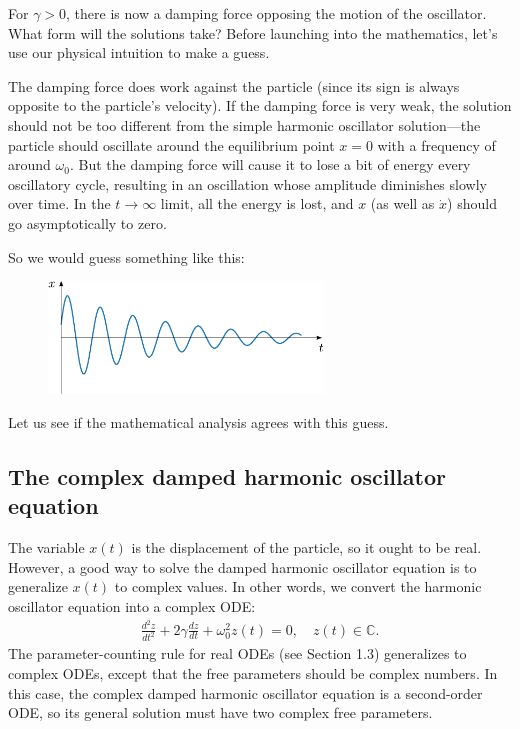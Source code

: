 \documentclass[10pt,a4paper]{article}
\begin{document}
For $\gamma > 0$, there is now a damping force opposing the motion of
the oscillator. What form will the solutions take?  Before launching
into the mathematics, let's use our physical intuition to make a
guess.

The damping force does work against the particle (since its sign is
always opposite to the particle's velocity). If the damping force is
very weak, the solution should not be too different from the simple
harmonic oscillator solution---the particle should oscillate around
the equilibrium point $x = 0$ with a frequency of around
$\omega_0$. But the damping force will cause it to lose a bit of
energy every oscillatory cycle, resulting in an oscillation whose
amplitude diminishes slowly over time. In the $t \rightarrow \infty$
limit, all the energy is lost, and $x$ (as well as $\dot{x}$) should
go asymptotically to zero.

So we would guess something like this:

\begin{figure}[ht]
  \centering\includegraphics[width=0.65\textwidth]{underdamped_guess}
\end{figure}

\noindent
Let us see if the mathematical analysis agrees with this guess.

\subsection{The complex damped harmonic oscillator equation}
\label{complex-solution}

The variable $x(t)$ is the displacement of the particle, so it ought
to be real. However, a good way to solve the damped harmonic
oscillator equation is to generalize $x(t)$ to complex values.  In
other words, we convert the harmonic oscillator equation into a
complex ODE:
\begin{align}
  \frac{d^2 z}{dt^2} + 2\gamma \frac{dz}{dt} + \omega_0^2 z(t) = 0, \quad z(t) \in \mathbb{C}.
\end{align}
The parameter-counting rule for real ODEs (see Section 1.3)
generalizes to complex ODEs, except that the free parameters should be
complex numbers. In this case, the complex damped harmonic oscillator
equation is a second-order ODE, so its general solution must have two
complex free parameters.
\end{document}
